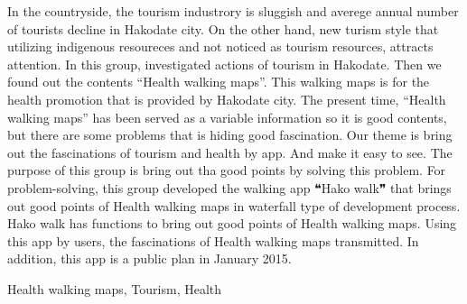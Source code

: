 ﻿\begin{eabstract}

In the countryside, the tourism industrory is sluggish and averege annual number of tourists decline in Hakodate city. On the other hand, new turism style that utilizing indigenous resoureces and not noticed as tourism resources, attracts attention. In this group, investigated actions of tourism in Hakodate. Then we found out the contents “Health walking maps”. This walking maps is for the health promotion that is provided by Hakodate city. The present time, “Health walking maps” has been served as a variable information so it is good contents, but there are some problems that is hiding good fascination. Our theme is bring out the fascinations of tourism and health by app. And make it easy to see. The purpose of this group is bring out tha good points by solving this problem. For problem-solving, this group developed the walking app ❝Hako walk❞ that brings out good points of Health walking maps in waterfall type of development process. Hako walk has functions to bring out good points of Health walking maps. Using this app by users, the fascinations of Health walking maps transmitted. In addition, this app is a public plan in January 2015.

\begin{ekeyword}
Health walking maps, Tourism, Health
\end{ekeyword}
\end{eabstract}
